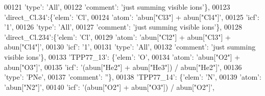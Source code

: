 \begin{DoxyCode}
00121                                        \textcolor{stringliteral}{'type'}: \textcolor{stringliteral}{'All'},
00122                                        \textcolor{stringliteral}{'comment'}: \textcolor{stringliteral}{'just summing visible ions'}\},
00123                          \textcolor{stringliteral}{'direct\_Cl.34'}:\{\textcolor{stringliteral}{'elem'}: \textcolor{stringliteral}{'Cl'},
00124                                        \textcolor{stringliteral}{'atom'}: \textcolor{stringliteral}{'abun["Cl3"] + abun["Cl4"]'},
00125                                        \textcolor{stringliteral}{'icf'}: \textcolor{stringliteral}{'1'},
00126                                        \textcolor{stringliteral}{'type'}: \textcolor{stringliteral}{'All'},
00127                                        \textcolor{stringliteral}{'comment'}: \textcolor{stringliteral}{'just summing visible ions'}\},
00128                          \textcolor{stringliteral}{'direct\_Cl.234'}:\{\textcolor{stringliteral}{'elem'}: \textcolor{stringliteral}{'Cl'},
00129                                        \textcolor{stringliteral}{'atom'}: \textcolor{stringliteral}{'abun["Cl2"] + abun["Cl3"] + abun["Cl4"]'},
00130                                        \textcolor{stringliteral}{'icf'}: \textcolor{stringliteral}{'1'},
00131                                        \textcolor{stringliteral}{'type'}: \textcolor{stringliteral}{'All'},
00132                                        \textcolor{stringliteral}{'comment'}: \textcolor{stringliteral}{'just summing visible ions'}\},
00133                          \textcolor{stringliteral}{'TPP77\_13'}: \{\textcolor{stringliteral}{'elem'}: \textcolor{stringliteral}{'O'},
00134                                       \textcolor{stringliteral}{'atom'}: \textcolor{stringliteral}{'abun["O2"] + abun["O3"]'},
00135                                       \textcolor{stringliteral}{'icf'}: \textcolor{stringliteral}{'(abun["He2"] + abun["He3"]) / abun["He2"]'},
00136                                       \textcolor{stringliteral}{'type'}: \textcolor{stringliteral}{'PNe'},
00137                                       \textcolor{stringliteral}{'comment'}: \textcolor{stringliteral}{''}\},
00138                          \textcolor{stringliteral}{'TPP77\_14'}: \{\textcolor{stringliteral}{'elem'}: \textcolor{stringliteral}{'N'},
00139                                       \textcolor{stringliteral}{'atom'}: \textcolor{stringliteral}{'abun["N2"]'},
00140                                       \textcolor{stringliteral}{'icf'}: \textcolor{stringliteral}{'(abun["O2"] + abun["O3"]) / abun["O2"]'},

\end{DoxyCode}
